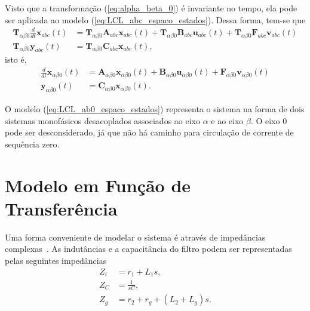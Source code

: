   Visto que a transformação (\ref{eq:alpha_beta_0}) é invariante no tempo, ela pode ser aplicada ao modelo (\ref{eq:LCL_abc_espaco_estados}). Dessa forma, tem-se que
  \begin{equation}
    \begin{split}
      \mathbf{T}_{\alpha \beta 0} \frac{d}{dt} \mathbf{x}_{abc}(t) & =
        \mathbf{T}_{\alpha \beta 0} \mathbf{A}_{abc} \mathbf{x}_{abc}(t) +
        \mathbf{T}_{\alpha \beta 0} \mathbf{B}_{abc} \mathbf{u}_{abc}(t) +
        \mathbf{T}_{\alpha \beta 0} \mathbf{F}_{abc} \mathbf{v}_{abc}(t) \\
      \mathbf{T}_{\alpha \beta 0} \mathbf{y}_{abc}(t) & =
        \mathbf{T}_{\alpha \beta 0} \mathbf{C}_{abc} \mathbf{x}_{abc}(t) \text{,}
    \end{split}
  \end{equation}
  isto é,
  \begin{equation}
    \begin{split}
      \frac{d}{dt} \mathbf{x}_{\alpha \beta 0}(t) & =
        \mathbf{A}_{\alpha \beta 0} \mathbf{x}_{\alpha \beta 0}(t) +
        \mathbf{B}_{\alpha \beta 0} \mathbf{u}_{\alpha \beta 0}(t) +
        \mathbf{F}_{\alpha \beta 0} \mathbf{v}_{\alpha \beta 0}(t) \\
      \mathbf{y}_{\alpha \beta 0}(t) & = \mathbf{C}_{\alpha \beta 0}
        \mathbf{x}_{\alpha \beta 0}(t) \text{.}
    \end{split}
    \label{eq:LCL_ab0_espaco_estados}
  \end{equation}

  O modelo (\ref{eq:LCL_ab0_espaco_estados}) representa o sistema na forma de dois sistemas monofásicos desacoplados associados ao eixo $\alpha$ e ao eixo $\beta$. O eixo $0$ pode ser desconsiderado, já que não há caminho para circulação de corrente de sequência zero.

\section{Modelo em Função de Transferência}

  Uma forma conveniente de modelar o sistema é através de impedâncias complexas~\cite{ref:XU}. As indutâncias e a capacitância do filtro podem ser representadas pelas seguintes impedâncias
  \begin{equation}
    \begin{split}
      Z_i & = r_1 + L_1 s \text{,} \\
      Z_C & = \frac{1}{s C} \text{,} \\
      Z_g & = r_2 + r_g + \left( L_2 + L_g \right) s \text{.}
    \end{split}
  \end{equation}

